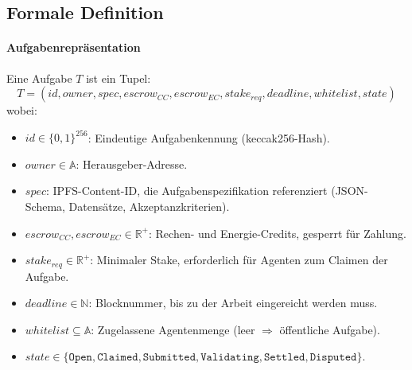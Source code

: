 \documentclass[11pt]{article}
\begin{document}
\subsection{Formale Definition}
\paragraph{Aufgabenrepräsentation} Eine Aufgabe $T$ ist ein Tupel:
\begin{equation}
T = (id, owner, spec, escrow_{CC}, escrow_{EC}, stake_{req}, deadline, whitelist, state)
\end{equation}
wobei:
\begin{itemize}[noitemsep]
  \item $id \in \{0,1\}^{256}$: Eindeutige Aufgabenkennung (keccak256-Hash).
  \item $owner \in \mathbb{A}$: Herausgeber-Adresse.
  \item $spec$: IPFS-Content-ID, die Aufgabenspezifikation referenziert (JSON-Schema, Datensätze, Akzeptanzkriterien).
  \item $escrow_{CC}, escrow_{EC} \in \mathbb{R}^+$: Rechen- und Energie-Credits, gesperrt für Zahlung.
  \item $stake_{req} \in \mathbb{R}^+$: Minimaler Stake, erforderlich für Agenten zum Claimen der Aufgabe.
  \item $deadline \in \mathbb{N}$: Blocknummer, bis zu der Arbeit eingereicht werden muss.
  \item $whitelist \subseteq \mathbb{A}$: Zugelassene Agentenmenge (leer $\Rightarrow$ öffentliche Aufgabe).
  \item $state \in \{\texttt{Open}, \texttt{Claimed}, \texttt{Submitted}, \texttt{Validating}, \texttt{Settled}, \texttt{Disputed}\}$.
\end{itemize}
\end{document}
